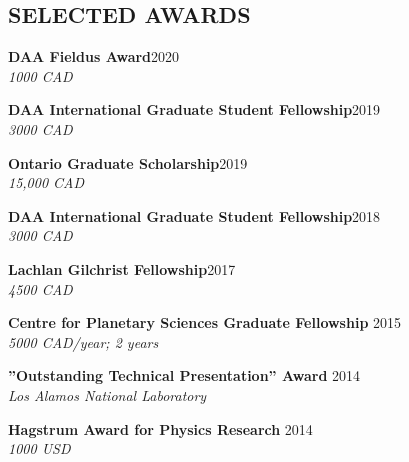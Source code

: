 \documentclass[10pt]{res} %
\begin{document}
\begin{resume}

\section{SELECTED AWARDS}

\textbf{DAA Fieldus Award}\hfill 2020\\{\sl 1000 CAD}

\textbf{DAA International Graduate Student Fellowship}\hfill 2019\\{\sl 3000 CAD}

\textbf{Ontario Graduate Scholarship}\hfill 2019\\{\sl 15,000 CAD}

\textbf{DAA International Graduate Student Fellowship}\hfill 2018\\{\sl 3000 CAD}

\textbf{Lachlan Gilchrist Fellowship}\hfill 2017\\
{\sl 4500 CAD}

\textbf{Centre for Planetary Sciences Graduate Fellowship} \hfill 2015\\
{\sl 5000 CAD/year; 2 years}

\textbf{”Outstanding Technical Presentation” Award} \hfill 2014\\
{\sl Los Alamos National Laboratory}


\textbf{Hagstrum Award for Physics Research} \hfill 2014 \\
{\sl 1000 USD}









\end{resume}
\end{document}
